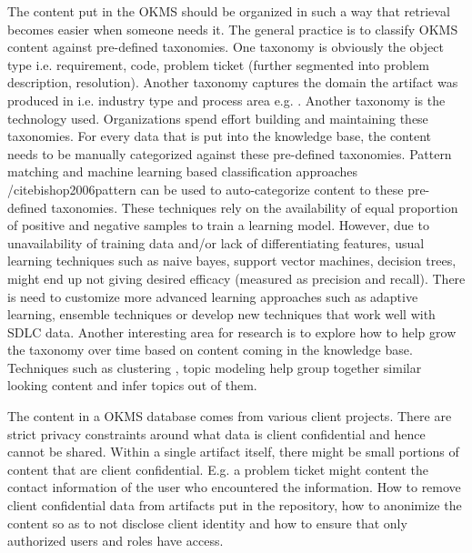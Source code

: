 The content put in the OKMS should be organized in such a way that retrieval becomes easier when someone needs it. The general practice is to classify OKMS content against pre-defined taxonomies. One taxonomy is obviously the object type i.e. requirement, code, problem ticket (further segmented into problem description, resolution). Another taxonomy captures the domain the artifact was produced in i.e. industry type and process area e.g. \cite{apqc,bph}. Another taxonomy is the technology used. Organizations spend effort building and maintaining these taxonomies. For every data that is put into the knowledge base, the content needs to be manually categorized against these pre-defined taxonomies. Pattern matching and machine learning based classification approaches /cite{bishop2006pattern} can be used to auto-categorize content to these pre-defined taxonomies. These techniques rely on the availability of equal proportion of positive and negative samples to train a learning model. However, due to unavailability of training data and/or lack of differentiating features, usual learning techniques such as naive bayes, support vector machines, decision trees, might end up not giving desired efficacy (measured as precision and recall). There is need to customize more advanced learning approaches such as adaptive learning, ensemble techniques or develop new techniques that work well with SDLC data. Another interesting area for research is to explore how to help grow the taxonomy over time based on content coming in the knowledge base. Techniques such as clustering \cite{Berkhin06}, topic modeling \cite{Blei:2012} help group together similar looking content and infer topics out of them. 

The content in a OKMS database comes from various client projects. There are strict privacy constraints around what data is client confidential and hence cannot be shared. Within a single artifact itself, there might be small portions of content that are client confidential. E.g. a problem ticket might content the contact information of the user who encountered the information. How to remove client confidential data from artifacts put in the repository, how to anonimize the content so as to not disclose client identity and how to ensure that only authorized users and roles have access.

